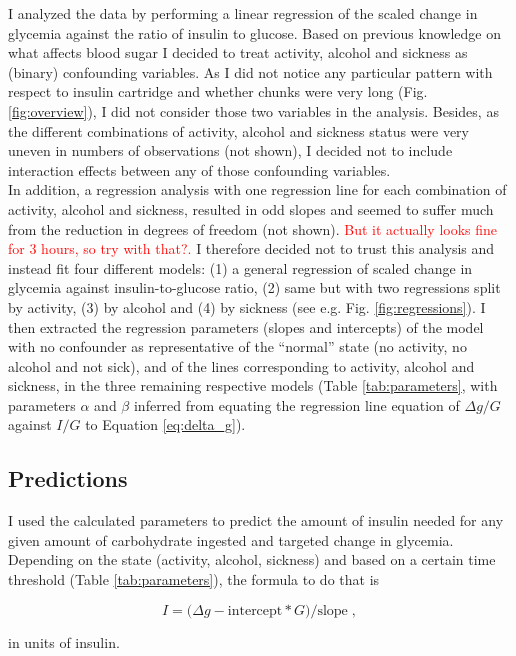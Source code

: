 I analyzed the data by performing a linear regression of the scaled change in glycemia against the ratio of insulin to glucose.
Based on previous knowledge on what affects blood sugar I decided to treat activity, alcohol and sickness as (binary) confounding variables.
As I did not notice any particular pattern with respect to insulin cartridge and whether chunks were very long (Fig. \ref{fig:overview}), I did not consider those two variables in the analysis.
Besides, as the different combinations of activity, alcohol and sickness status were very uneven in numbers of observations (not shown), I decided not to include interaction effects between any of those confounding variables.\\

In addition, a regression analysis with one regression line for each combination of activity, alcohol and sickness, resulted in odd slopes and seemed to suffer much from the reduction in degrees of freedom (not shown).
\textcolor{red}{But it actually looks fine for 3 hours, so try with that?.}
I therefore decided not to trust this analysis and instead fit four different models: (1) a general regression of scaled change in glycemia against insulin-to-glucose ratio, (2) same but with two regressions split by activity, (3) by alcohol and (4) by sickness (see e.g. Fig. \ref{fig:regressions}).
I then extracted the regression parameters (slopes and intercepts) of the model with no confounder as representative of the ``normal'' state (no activity, no alcohol and not sick), and of the lines corresponding to activity, alcohol and sickness, in the three remaining respective models (Table \ref{tab:parameters}, with parameters $\alpha$ and $\beta$ inferred from equating the regression line equation of $\Delta g / G$ against $I / G$ to Equation \ref{eq:delta_g}).

\subsection*{Predictions}

I used the calculated parameters to predict the amount of insulin needed for any given amount of carbohydrate ingested and targeted change in glycemia.
Depending on the state (activity, alcohol, sickness) and based on a certain time threshold (Table \ref{tab:parameters}), the formula to do that is

\begin{equation}
    I = \big(\Delta g - \text{intercept} * G\big) / \text{slope} \; ,
\end{equation}

\noindent in units of insulin.
